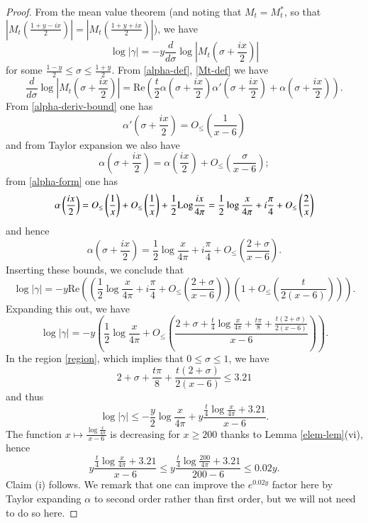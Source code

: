 \begin{proof}
From the mean value theorem (and noting that $M_t = M_t^*$, so that $\left|M_t\left(\frac{1+y-ix}{2}\right)\right| = \left|M_t\left(\frac{1+y+ix}{2}\right)\right|$), we have
$$ \log|\gamma| = -y \frac{d}{d\sigma} \log \left|M_t\left( \sigma + \frac{ix}{2}\right)\right| $$
for some $\frac{1-y}{2} \leq \sigma \leq \frac{1+y}{2}$.  From \eqref{alpha-def}, \eqref{Mt-def} we have
$$ \frac{d}{d\sigma} \log \left|M_t\left( \sigma + \frac{ix}{2}\right)\right| = \mathrm{Re}\left( \frac{t}{2} \alpha\left(\sigma+\frac{ix}{2}\right) \alpha'\left(\sigma+\frac{ix}{2}\right) + \alpha\left(\sigma+\frac{ix}{2}\right) \right).$$
From \eqref{alpha-deriv-bound} one has
\begin{equation}\label{alphap-b}
 \alpha'\left(\sigma+\frac{ix}{2}\right) = O_{\leq}\left( \frac{1}{x-6} \right)
\end{equation}
and from Taylor expansion we also have
$$ \alpha(\sigma+\frac{ix}{2}) = \alpha\left(\frac{ix}{2}\right) + O_{\leq}\left( \frac{\sigma}{x-6} \right);$$
from \eqref{alpha-form} one has
$$ \alpha\left(\frac{ix}{2}\right) = O_{\leq}\left(\frac{1}{x}\right) + O_{\leq}\left(\frac{1}{x}\right) + \frac{1}{2} {\operatorname{Log}} \frac{ix}{4\pi} 
= \frac{1}{2} \log \frac{x}{4\pi} + i \frac{\pi}{4} + O_{\leq}\left( \frac{2}{x} \right) $$
and hence
\begin{equation}\label{asig}
 \alpha(\sigma+\frac{ix}{2}) = \frac{1}{2} \log \frac{x}{4\pi} + i \frac{\pi}{4} + O_{\leq}\left( \frac{2+\sigma}{x-6} \right).
\end{equation}
Inserting these bounds, we conclude that
$$ \log|\gamma| = -y \mathrm{Re} \left( \left(\frac{1}{2} \log \frac{x}{4\pi} + i \frac{\pi}{4} + O_{\leq}\left( \frac{2+\sigma}{x-6} \right)\right) \left(1 + O_{\leq}\left(\frac{t}{2(x-6)}\right)\right) \right).$$
Expanding this out, we have
$$ \log|\gamma| = -y \left(\frac{1}{2} \log \frac{x}{4\pi} + O_{\leq}\left( \frac{2+\sigma + \frac{t}{4} \log \frac{x}{4\pi} + \frac{t\pi}{8} + \frac{t(2+\sigma)}{2(x-6)}}{x-6} \right)\right).$$
In the region \eqref{region}, which implies that $0 \leq \sigma \leq 1$, we have
$$ 2 + \sigma + \frac{t\pi}{8} + \frac{t(2+\sigma)}{2(x-6)} \leq 3.21$$
and thus
$$ \log|\gamma| \leq -\frac{y}{2} \log \frac{x}{4\pi} + y \frac{\frac{t}{4} \log \frac{x}{4\pi} + 3.21}{x-6}.$$
The function $x \mapsto \frac{\log \frac{x}{4\pi}}{x-6}$ is decreasing for $x \geq 200$ thanks to Lemma \ref{elem-lem}(vi), hence
$$ y \frac{\frac{t}{4} \log \frac{x}{4\pi} + 3.21}{x-6} \leq y \frac{\frac{t}{4} \log \frac{200}{4\pi} + 3.21}{200-6} \leq 0.02 y.$$
Claim (i) follows.  We remark that one can improve the $e^{0.02 y}$ factor here by Taylor expanding $\alpha$ to second order rather than first order, but we will not need to do so here.


\end{proof}
